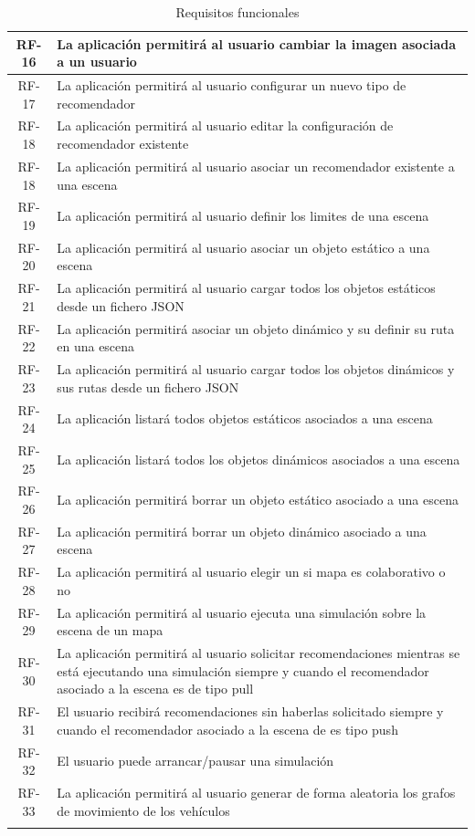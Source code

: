 \begin{longtable}[H]{|c|p{10cm}|}
	RF-16 & La aplicación permitirá al usuario cambiar la imagen asociada a un usuario\\ \hline
	RF-17 & La aplicación permitirá al usuario configurar un nuevo tipo de recomendador\\ \hline
	RF-18 & La aplicación permitirá al usuario editar la configuración de recomendador existente\\ \hline
	RF-18 & La aplicación permitirá al usuario asociar un recomendador existente a una escena\\ \hline
	RF-19 & La aplicación permitirá al usuario definir los limites de una escena\\ \hline
	RF-20 & La aplicación permitirá al usuario asociar un objeto estático a una escena\\ \hline
	RF-21 & La aplicación permitirá al usuario cargar todos los objetos estáticos desde un fichero JSON\\ \hline
	RF-22 & La aplicación permitirá asociar un objeto dinámico y su definir su ruta en una escena\\ \hline
	RF-23 & La aplicación permitirá al usuario cargar todos los objetos dinámicos y sus rutas desde un fichero JSON\\ \hline
	RF-24 & La aplicación listará todos objetos estáticos asociados a una escena \\ \hline
	RF-25 & La aplicación listará todos los objetos dinámicos asociados a una escena \\ \hline
	RF-26 & La aplicación permitirá borrar un objeto estático asociado a una escena\\ \hline
	RF-27 & La aplicación permitirá borrar un objeto dinámico asociado a una escena\\ \hline
	RF-28 & La aplicación permitirá al usuario elegir un si mapa es colaborativo o no\\ \hline
	RF-29 & La aplicación permitirá al usuario ejecuta una simulación sobre la escena de un mapa\\ \hline
	RF-30 & La aplicación permitirá al usuario solicitar recomendaciones mientras se está ejecutando una simulación siempre y cuando el recomendador asociado a la escena es de tipo pull\\ \hline
	RF-31 & El usuario recibirá recomendaciones sin haberlas solicitado siempre y cuando el recomendador asociado a la escena de es tipo push\\ \hline
	RF-32 & El usuario puede arrancar/pausar una simulación\\ \hline
	RF-33 & La aplicación permitirá al usuario generar de forma aleatoria los grafos de movimiento de los vehículos \\ \hline	
	\caption{Requisitos funcionales}
	\label{tabla:requisitosFuncionales}
\end{longtable}

